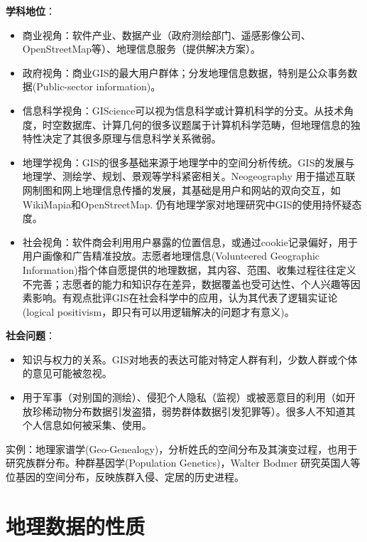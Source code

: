 \par \textbf{学科地位}：
\begin{itemize}
    \item 商业视角：软件产业、数据产业（政府测绘部门、遥感影像公司、OpenStreetMap等）、地理信息服务（提供解决方案）。
    \item 政府视角：商业GIS的最大用户群体；分发地理信息数据，特别是公众事务数据(Public-sector information)。
    \item 信息科学视角：GIScience可以视为信息科学或计算机科学的分支。从技术角度，时空数据库、计算几何的很多议题属于计算机科学范畴，但地理信息的独特性决定了其很多原理与信息科学关系微弱。
    \item 地理学视角：GIS的很多基础来源于地理学中的空间分析传统。GIS的发展与地理学、测绘学、规划、景观等学科紧密相关。Neogeography 用于描述互联网制图和网上地理信息传播的发展，其基础是用户和网站的双向交互，如WikiMapia和OpenStreetMap. 仍有地理学家对地理研究中GIS的使用持怀疑态度。
    \item 社会视角：软件商会利用用户暴露的位置信息，或通过cookie记录偏好，用于用户画像和广告精准投放。志愿者地理信息(Volunteered Geographic Information)指个体自愿提供的地理数据，其内容、范围、收集过程往往定义不完善；志愿者的能力和知识存在差异，数据覆盖也受可达性、个人兴趣等因素影响。有观点批评GIS在社会科学中的应用，认为其代表了逻辑实证论(logical positivism，即只有可以用逻辑解决的问题才有意义)。
\end{itemize}

\par \textbf{社会问题}：
\begin{itemize}
    \item 知识与权力的关系。GIS对地表的表达可能对特定人群有利，少数人群或个体的意见可能被忽视。
    \item 用于军事（对别国的测绘）、侵犯个人隐私（监视）或被恶意目的利用（如开放珍稀动物分布数据引发盗猎，弱势群体数据引发犯罪等）。很多人不知道其个人信息如何被采集、使用。
\end{itemize}

\par 实例：地理家谱学(Geo-Genealogy)，分析姓氏的空间分布及其演变过程，也用于研究族群分布。种群基因学(Population Genetics)，Walter Bodmer 研究英国人等位基因的空间分布，反映族群入侵、定居的历史进程。

\section{地理数据的性质}

